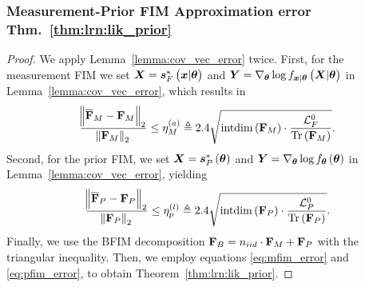 \subsubsection{Measurement-Prior {FIM } {Approximation error} {Thm.~\ref{thm:lrn:lik_prior}}}\label{proof:lik_prior:lrn}
\begin{proof}
{
We apply Lemma~\ref{lemma:cov_vec_error} twice.
First, for} the measurement FIM  
we set $\Xr=\lscores{\x}{\p}$ and $\Yr=\nabla_{\p}\log\probt{\X|\p}{\x|\p}$
{in} Lemma~\ref{lemma:cov_vec_error}, which results in
\begin{equation}\label{eq:mfim_error}
    \frac{\norm{\overline{\mathbf{F}}_{M}-\mathbf{F}_{M}}_2}{\norm{\mathbf{F}_{M}}_2}\leq \eta_{M}^{(a)}\triangleq {2.4}\sqrt{\mathrm{intdim}\left(\mathbf{F}_{M}\right)\cdot \frac{{\mathcal{L}_{F}^{0}}}{\mathrm{Tr}\left(\mathbf{F}_{M}\right)}}.
\end{equation}
{Second, for} the 
prior FIM, we set $\Xr=\priorscores{\p}$ and $\Yr=\nabla_{\p}\log\probt{\p}{\p}$
{in} Lemma~\ref{lemma:cov_vec_error}, yielding
\begin{equation}\label{eq:pfim_error}
    \frac{\norm{\overline{\mathbf{F}}_{P}-\mathbf{F}_{P}}_2}{\norm{\mathbf{F}_{P}}_2}  \leq\eta_{p}^{(l)}\triangleq {2.4}\sqrt{\mathrm{intdim}\left(\mathbf{F}_{P}\right)\cdot \frac{{\mathcal{L}_{P}^{0}}}{\mathrm{Tr}\left(\mathbf{F}_{P}\right)}}.
\end{equation}
Finally, we use the BFIM decomposition $\mathbf{F}_{B}=n_{iid}\cdot\mathbf{F}_{M}+\mathbf{F}_{P}$ with the triangular inequality. Then, we employ equations \eqref{eq:mfim_error} and \eqref{eq:pfim_error}, to obtain Theorem~\ref{thm:lrn:lik_prior}.
\end{proof}


